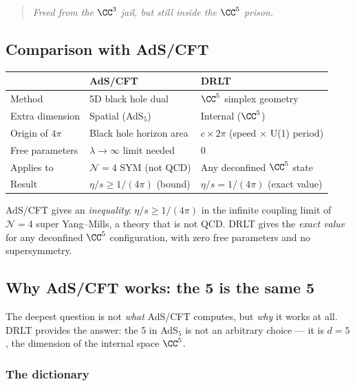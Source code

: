 \begin{quote}
\emph{Freed from the $\CC^3$ jail, but still inside the $\CC^5$ prison.}
\end{quote}

\subsection{Comparison with AdS/CFT}

\begin{center}
\begin{tabular}{lll}
\hline
& AdS/CFT & DRLT \\
\hline
Method & 5D black hole dual & $\CC^5$ simplex geometry \\
Extra dimension & Spatial (AdS$_5$) & Internal ($\CC^5$) \\
Origin of $4\pi$ & Black hole horizon area & $c \times 2\pi$ (speed $\times$ U(1) period) \\
Free parameters & $\lambda \to \infty$ limit needed & 0 \\
Applies to & $\mathcal{N}{=}4$ SYM (not QCD) & Any deconfined $\CC^5$ state \\
Result & $\eta/s \geq 1/(4\pi)$ (bound) & $\eta/s = 1/(4\pi)$ (exact value) \\
\hline
\end{tabular}
\end{center}

AdS/CFT gives an \emph{inequality}: $\eta/s \geq 1/(4\pi)$ in the infinite coupling limit of $\mathcal{N} = 4$ super Yang--Mills, a theory that is not QCD. DRLT gives the \emph{exact value} for any deconfined $\CC^5$ configuration, with zero free parameters and no supersymmetry.

\subsection{Why AdS/CFT works: the 5 is the same 5}

The deepest question is not \emph{what} AdS/CFT computes, but \emph{why} it works at all. DRLT provides the answer: the 5 in AdS$_5$ is not an arbitrary choice --- it is $d = 5$, the dimension of the internal space $\CC^5$.

\subsubsection{The dictionary}

